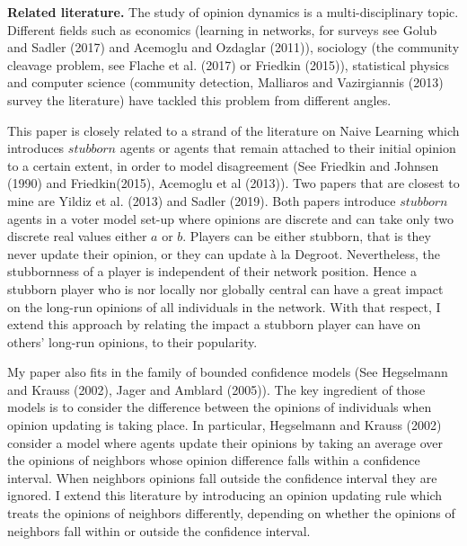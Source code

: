 \documentclass{article}
\begin{document}
\bigskip

{\bf Related literature.} The study of opinion dynamics is a multi-disciplinary topic. Different fields such as economics (learning in networks, for surveys see Golub and Sadler (2017)\cite{golubsadler} and Acemoglu and Ozdaglar (2011)\cite{acemoglu}), sociology (the community cleavage problem, see Flache et al. (2017)\cite{flachesurvey2017} or Friedkin (2015)\cite{friedkin2015}),  statistical physics and computer science (community detection, Malliaros and Vazirgiannis (2013)\cite{malliaros} survey the literature) have tackled this problem from different angles. 

This paper is closely related to a strand of the literature on Naive Learning which introduces $stubborn$ agents or agents that remain attached to their initial opinion to a certain extent, in order to model disagreement (See Friedkin and Johnsen (1990)\cite{friedkin} and Friedkin(2015)\cite{friedkin2015}, Acemoglu et al (2013)\cite{acemoglu2013}). Two papers that are closest to mine are Yildiz et al. (2013)\cite{yildiz2013} and Sadler (2019)\cite{sadler}. Both papers introduce $stubborn$ agents in a voter model set-up where opinions are discrete and can take only two discrete real values either $a$ or $b$. Players can be either stubborn, that is they never update their opinion, or they can update \`{a} la Degroot. Nevertheless, the stubbornness of a player is independent of their network position. Hence a stubborn player who is nor locally nor globally central can have a great impact on the long-run opinions of all individuals in the network. With that respect, I extend this approach by relating the impact a stubborn player can have on others' long-run opinions, to their popularity.  %

My paper also fits in the family of bounded confidence models (See Hegselmann and Krauss (2002)\cite{hegselmann}, Jager and Amblard (2005)\cite{jager}). The key ingredient of those models is to consider the difference between the opinions of individuals when opinion updating is taking place. In particular, Hegselmann and Krauss (2002)\cite{hegselmann} consider a model where agents update their opinions by taking an average over the opinions of neighbors whose opinion difference falls within a confidence interval. When neighbors opinions fall outside the confidence interval they are ignored. I extend this literature by introducing an opinion updating rule which treats the opinions of neighbors differently, depending on whether the opinions of neighbors fall within or outside the confidence interval. 
\end{document}
